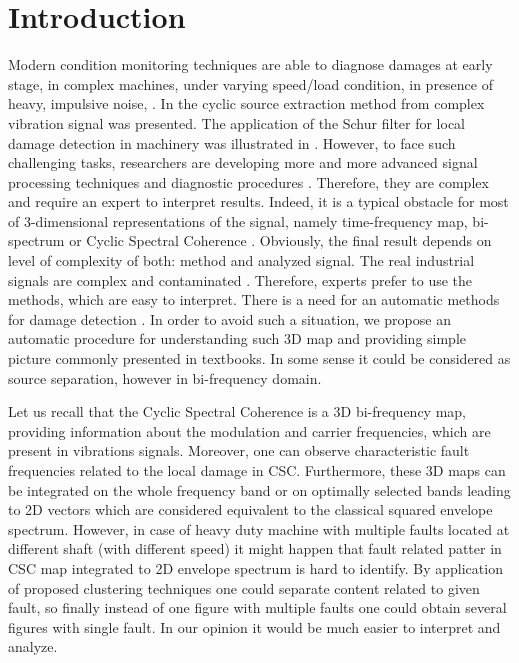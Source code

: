 \documentclass[11pt]{article}
\begin{document}
\section{Introduction}

Modern condition monitoring techniques are able to diagnose damages at early stage, in complex machines, under varying speed/load condition, in presence of heavy, impulsive noise, \cite{wylomanska2017application,borghesani2013new,schmidt2018novelty,gryllias2018application,javorskyj2016periodically}. In \cite{kruczek2017cyclic} the cyclic source extraction method from complex vibration signal was presented. The application of the Schur filter for local damage detection in machinery was illustrated in \cite{makowski2014new}.
However, to face such challenging tasks, researchers are developing more and more advanced signal processing techniques and diagnostic procedures \cite{wylomanska2016impulsive,hu2016development,michalak2017application}. Therefore, they are  complex and  require an expert to interpret results. Indeed, it is a typical obstacle  for most of 3-dimensional representations of the signal, namely time-frequency map, bi-spectrum or Cyclic Spectral Coherence \cite{kruczek2017multiple}. Obviously, the final result depends on level of complexity of both: method and analyzed signal. 
The real industrial signals are complex and  contaminated . Therefore, experts prefer to use the methods, which are easy to interpret. There is a need for an automatic methods for damage detection \cite{wodecki2018optimal}. In order to avoid such a situation, we propose an automatic procedure for understanding such 3D map and providing simple picture commonly presented in textbooks. In some sense it could be considered as source separation, however in bi-frequency domain. 

 Let us recall that the Cyclic Spectral Coherence is  a 3D bi-frequency map, providing information about the modulation and carrier frequencies, which are present in vibrations signals. Moreover, one can observe  characteristic fault frequencies related to the local damage  in CSC. Furthermore, these 3D maps can be  integrated on the whole frequency band or on optimally selected bands leading to 2D vectors which are considered equivalent to the classical squared envelope spectrum.
 However, in case of heavy duty machine with multiple faults located at different shaft (with different speed) it might happen that fault related patter in CSC map integrated to 2D envelope spectrum is hard to identify. By application of proposed clustering techniques one could separate content related to given fault, so finally instead of one figure with multiple faults one could obtain several  figures with single fault. In our opinion it would be much easier to interpret and analyze. 
\end{document}

